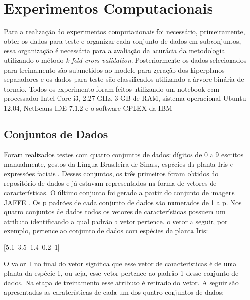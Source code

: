 \chapter{Experimentos Computacionais}
Para a realização do experimentos computacionais foi necessário, primeiramente, obter os dados para teste e organizar cada conjunto de dados em subconjuntos, essa organização é necessária para a avaliação da acurácia da metodologia utilizando o método \textit{k-fold cross validation}. Posteriormente os dados selecionados para treinamento são submetidos ao modelo para geração dos hiperplanos separadores e os dados para teste são classificados utilizando a árvore binária de torneio. Todos os experimento foram feitos utilizando um notebook com processador Intel Core i3, 2.27 GHz, 3 GB de RAM, sistema operacional Ubuntu 12.04, NetBeans IDE 7.1.2 e o software CPLEX da IBM.

\section{Conjuntos de Dados}
Foram realizados testes com quatro conjuntos de dados: dígitos de 0 a 9 escritos manualmente, gestos da Língua Brasileira de Sinais, espécies da planta Iris e expressões faciais . Desses conjuntos, os três primeiros foram obtidos do repositório de dados  e já estavam representados na forma de vetores de características. O último conjunto foi gerado a partir do conjunto de imagens JAFFE \cite{Jaffe}. Os p padrões de cada conjunto de dados são numerados de 1 a p. Nos quatro conjuntos de dados todos os vetores de características possuem um atributo identificando a qual padrão o vetor pertence, o vetor a seguir, por exemplo, pertence ao conjunto de dados com espécies da planta Iris:

[5.1\  3.5\  1.4\ 0.2\  1]

O valor 1 no final do vetor significa que esse vetor de características é de uma planta da espécie 1, ou seja, esse vetor pertence ao padrão 1 desse conjunto de dados. 
Na etapa de treinamento esse atributo é retirado do vetor. A seguir são apresentadas as caraterísticas de cada um dos quatro conjuntos de dados:

